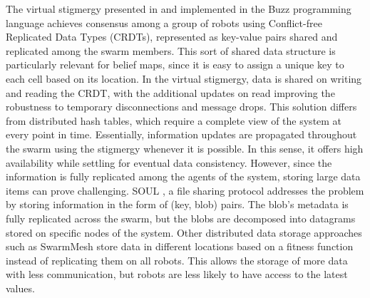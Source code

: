 The virtual stigmergy presented in \cite{pinciroliTuple2016} and implemented in the Buzz
programming language \cite{pinciroliBuzz2016} achieves consensus among
a group of robots using Conflict-free Replicated Data Types (CRDTs),
represented as key-value pairs shared and replicated among the swarm members. This sort of shared data structure is particularly relevant for belief maps, since it is easy to assign a unique key to each cell based on its location.  In the virtual stigmergy, data is shared on writing and reading the CRDT, with the
additional updates on read improving the robustness to temporary
disconnections and message drops. This solution differs from
distributed hash tables, which require a complete view of the system
at every point in time. Essentially, information updates are propagated throughout the swarm using the stigmergy whenever it is possible. In this sense, it offers high availability while settling for eventual data consistency. However, since the information is fully replicated among the agents of the system, storing large data items can prove challenging. SOUL \cite{varadharajan2020soul}, a file sharing protocol addresses the problem by storing information in the form of (key, blob) pairs. The blob’s metadata is fully replicated across the swarm, but the blobs are decomposed into datagrams stored on specific nodes of the system. Other distributed data storage approaches such as SwarmMesh \cite{majcherczykSwarmmesh2020} store data in different
locations based on a fitness function instead of replicating them on
all robots. This allows the storage of more data with less
communication, but robots are less likely to have access to the latest
values.

